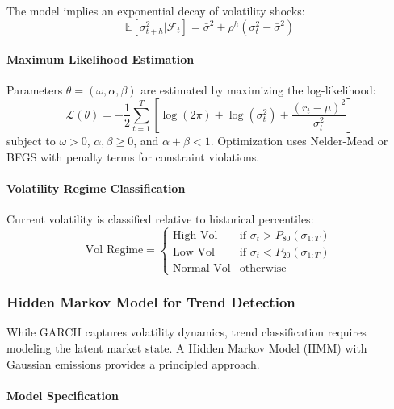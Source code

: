 The model implies an exponential decay of volatility shocks:
\begin{equation}
  \mathbb{E}[\sigma_{t+h}^2 | \mathcal{F}_t] = \bar{\sigma}^2 + \rho^h (\sigma_t^2 - \bar{\sigma}^2)
\end{equation}

\paragraph{Maximum Likelihood Estimation}

Parameters $\theta = (\omega, \alpha, \beta)$ are estimated by maximizing the log-likelihood:
\begin{equation}
  \mathcal{L}(\theta) = -\frac{1}{2} \sum_{t=1}^{T} \left[ \log(2\pi) + \log(\sigma_t^2) + \frac{(r_t - \mu)^2}{\sigma_t^2} \right]
\end{equation}
subject to $\omega > 0$, $\alpha, \beta \geq 0$, and $\alpha + \beta < 1$. Optimization uses Nelder-Mead or BFGS with penalty terms for constraint violations.

\paragraph{Volatility Regime Classification}

Current volatility is classified relative to historical percentiles:
\begin{equation}
  \text{Vol Regime} = \begin{cases}
    \text{High Vol} & \text{if } \sigma_t > P_{80}(\sigma_{1:T}) \\
    \text{Low Vol} & \text{if } \sigma_t < P_{20}(\sigma_{1:T}) \\
    \text{Normal Vol} & \text{otherwise}
  \end{cases}
\end{equation}

\subsubsection{Hidden Markov Model for Trend Detection}

While GARCH captures volatility dynamics, trend classification requires modeling the latent market state. A Hidden Markov Model (HMM) with Gaussian emissions provides a principled approach.

\paragraph{Model Specification}

